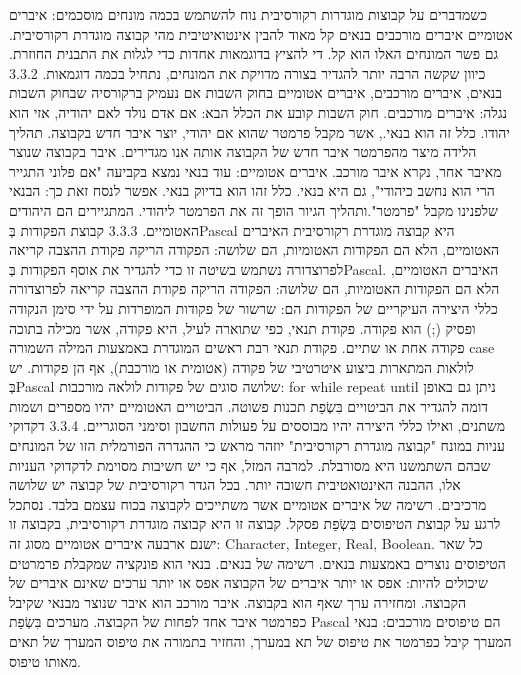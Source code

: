 כשמדברים על קבוצות מוגדרות רקורסיבית נוח להשתמש בכמה מונחים מוסכמים:
איברים אטומיים
איברים מורכבים
בנאים
קל מאוד להבין אינטואיטיבית מהי קבוצה מוגדרת רקורסיבית. גם פשר המונחים האלו הוא קל. די להציץ בדוגמאות אחדות כדי לגלות את התבנית החוזרת. כיוון שקשה הרבה יותר להגדיר בצורה מדויקת את המונחים, נתחיל בכמה דוגמאות.
​3.3.2​ בנאים, איברים מורכבים, איברים אטומיים בחוק השבות
אם נעמיק ברקורסיה שבחוק השבות נגלה:
איברים מורכבים. חוק השבות קובע את הכלל הבא: אם אדם נולד לאם יהודיה, אזי הוא יהודו. כלל זה הוא בנאי., אשר מקבל פרמטר שהוא אם יהודי, יוצר איבר חדש בקבוצה. תהליך הלידה מיצר מהפרמטר איבר חדש של הקבוצה אותה אנו מגדירים. איבר בקבוצה שנוצר מאיבר אחר, נקרא איבר מורכב.
איברים אטומיים: עוד בנאי נמצא בקביעה "אם פלוני התגייר הרי הוא נחשב כיהודי", גם היא בנאי. כלל זהו הוא בדיוק בנאי. אפשר לנסח זאת כך: הבנאי שלפנינו מקבל "פרמטר".ותהליך הגיור הופך זה את הפרמטר ליהודי. המתגיירים הם היהודים האטומיים.
​3.3.3​ קבוצת הפקודות בְּPascal היא קבוצה מוגדרת רקורסיבית
האיברים האטומיים, הלא הם הפקודות האטומיות, הם שלושה:
הפקודה הריקה
פקודת ההצבה
קריאה לפרוצדורה
נשתמש בשיטה זו כדי להגדיר את אוסף הפקודות בְּPascal. האיברים האטומיים, הלא הם הפקודות האטומיות, הם שלושה:
הפקודה הריקה
פקודת ההצבה
קריאה לפרוצדורה
כללי היצירה העיקריים של הפקודות הם:
שרשור של פקודות המופרדות על ידי סימן הנקודה ופסיק (;) הוא פקודה.
פקודת תנאי, כפי שתוארה לעיל, היא פקודה, אשר מכילה בתוכה פקודה אחת או שתיים.
פקודת תנאי רבת ראשים המוגדרת באמצעות המילה השמורה case
לולאות המתארות ביצוע איטרטיבי של פקודה (אטומית או מורכבת), אף הן פקודות. יש בְּPascal שלושה סוגים של פקודות לולאה מורכבות:
for
while
repeat until
ניתן גם באופן דומה להגדיר את הביטויים בִּשְׂפַת תכנות פשוטה. הביטויים האטומיים יהיו מספרים ושמות משתנים, ואילו כללי היצירה יהיו מבוססים על פעולות החשבון וסימני הסוגריים.
​3.3.4​ דקדוקי עניות במונח "קבוצה מוגדרת רקורסיבית"
יוזהר מראש כי ההגדרה הפורמלית הזו של המונחים שבהם השתמשנו היא מסורבלת. למרבה המזל, אף כי יש חשיבות מסוימת לדקדוקי העניות אלו, ההבנה האינטואטיבית חשובה יותר.
בכל הגדר רקורסיבית של קבוצה יש שלושה מרכיבים.
רשימה של איברים אטומיים אשר משתייכים לקבוצה בכוח עצמם בלבד.
נסתכל לרגע על קבוצת הטיפוסים בִּשְׂפַת פסקל. קבוצה זו היא קבוצה מוגדרת רקורסיבית, בקבוצה זו ישנם ארבעה איברים אטומיים מסוג זה: Character, Integer, Real, Boolean. כל שאר הטיפוסים נוצרים באמצעות בנאים.
רשימה של בנאים.
בנאי הוא פונקציה שמקבלת פרמרטים שיכולים להיות:
אפס או יותר איברים של הקבוצה
אפס או יותר ערכים שאינם איברים של הקבוצה.
ומחזירה ערך שאף הוא בקבוצה.
איבר מורכב הוא איבר שנוצר מבנאי שקיבל כפרמטר איבר אחד לפחות של הקבוצה.
מערכים בִּשְׂפַת Pascal הם טיפוסים מורכבים: בנאי המערך קיבל כפרמטר את טיפוס של תא במערך, והחזיר בתמורה את טיפוס המערך של תאים מאותו טיפוס.
